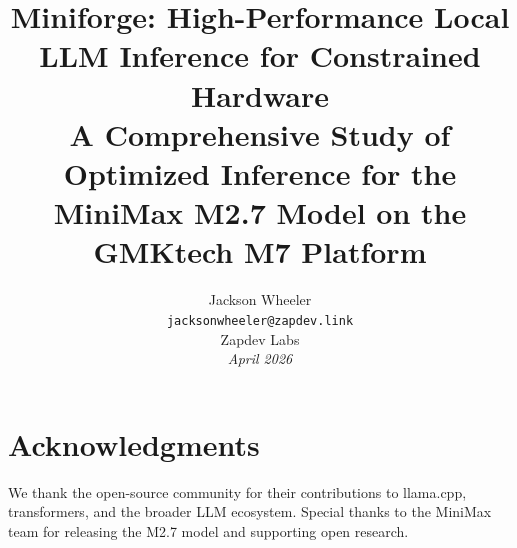 \documentclass[11pt,a4paper]{article}
\title{
\textbf{Miniforge: High-Performance Local LLM Inference for Constrained Hardware}\\[0.5em]
\large A Comprehensive Study of Optimized Inference for the MiniMax M2.7 Model on the GMKtech M7 Platform
}
\author{
Jackson Wheeler\\
\texttt{jacksonwheeler@zapdev.link}\\
Zapdev Labs\\
\textit{April 2026}
}
\date{}
\begin{document}
\maketitle

\begin{abstract}

\end{abstract}

\newpage

\tableofcontents
\newpage

\listoffigures
\newpage

\listoftables
\newpage


















\section*{Acknowledgments}
We thank the open-source community for their contributions to llama.cpp, transformers, and the broader LLM ecosystem. Special thanks to the MiniMax team for releasing the M2.7 model and supporting open research.

\newpage



\newpage
\appendix



\end{document}
